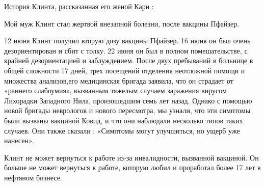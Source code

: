 История Клинта, рассказанная его женой Кари :

Мой муж Клинт стал жертвой внезапной болезни, после  вакцины Пфайзер.

12 июня Клинт получил вторую дозу вакцины Пфайзер. 16 июня он был очень
дезориентирован и сбит с толку. 22 июня он был в полном помешательстве, с
крайней дезориентацией и заблуждением. После двух пребываний в больнице в общей
сложности 17 дней, трех посещений отделения неотложной помощи и множества
анализов,его медицинская бригада заявила, что он страдает от «раннего
слабоумия», вызванным тяжелым случаем заражения вирусом Лихорадки Западного
Нила, произошедшим семь лет назад. Однако с помощью новой бригады неврологов и
нового пересмотра, мы узнали, что эти симптомы были вызваны вакциной Ковид, и
что они наблюдали несколько типов таких случаев. Они также сказали : «Симптомы
могут улучшиться, но ущерб уже нанесен».

Клинт не может вернуться к работе из-за инвалидности, вызванной вакциной. Он
больше не может вернуться к работе, которую любил и проработал более 17 лет в
нефтяном бизнесе.

